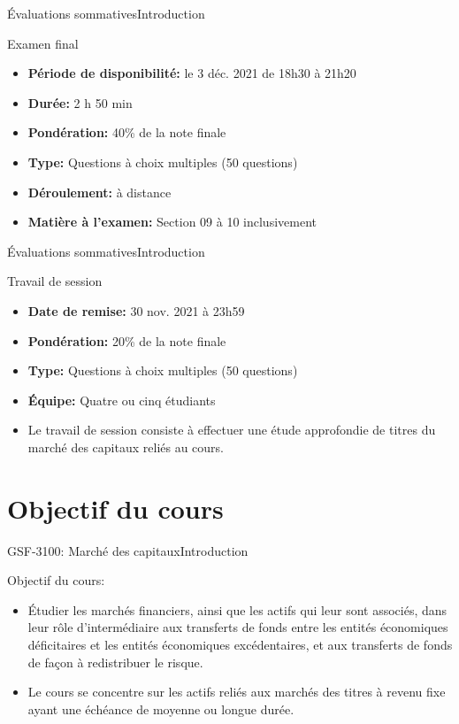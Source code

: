 \documentclass{beamer}
\begin{document}
\begin{frame}{Évaluations sommatives}{Introduction}
  \begin{block}{Examen final}
\begin{itemize}
\item \textbf{Période de disponibilité:} le 3 déc. 2021 de 18h30 à 21h20
\item \textbf{Durée:} 2 h 50 min
\item \textbf{Pondération:} 40\% de la note finale 
\item \textbf{Type:} Questions à choix multiples (50 questions)
\item \textbf{Déroulement:}  à distance 
\item \textbf{Matière à l'examen:} Section 09 à 10 inclusivement 
\end{itemize}
\end{block}
\end{frame}


\begin{frame}{Évaluations sommatives}{Introduction}
  \begin{block}{Travail de session}
\begin{itemize}
\item \textbf{Date de remise:} 30 nov. 2021 à 23h59
\item \textbf{Pondération:} 20\% de la note finale 
\item \textbf{Type:} Questions à choix multiples (50 questions)
\item \textbf{Équipe:} Quatre ou cinq étudiants
\item Le travail de session consiste à effectuer une étude approfondie de titres du marché des capitaux reliés au cours.
\end{itemize}
\end{block}
\end{frame}


\section{Objectif du cours}
\begin{frame}{GSF-3100: Marché des capitaux}{Introduction}
  \begin{block}{Objectif du cours:}
\begin{itemize}
\item Étudier les marchés financiers, ainsi que les actifs qui leur sont associés, dans leur rôle d’intermédiaire aux transferts de fonds entre les entités économiques déficitaires et les entités économiques excédentaires, et aux transferts de fonds de façon à redistribuer le risque. 
\item  Le cours se concentre sur les actifs reliés aux marchés des titres à revenu fixe ayant une échéance de moyenne ou longue durée.
\end{itemize}
  \end{block}
\end{frame}
\end{document}
